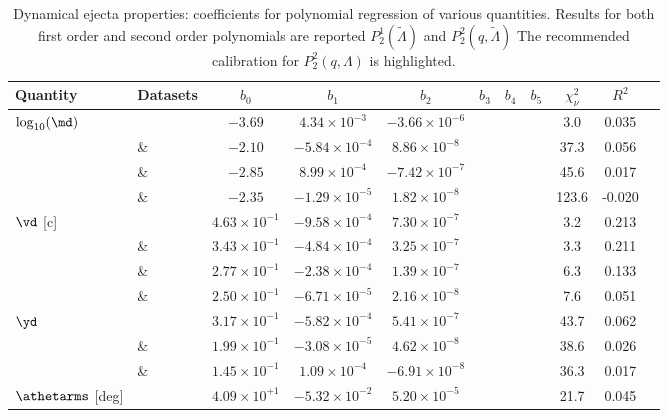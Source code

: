 

\begin{table*}
    \caption{
        \label{tab:dynfit:poly}
        Dynamical ejecta properties:
        coefficients for polynomial regression of various
        quantities. Results for both
        first order and second order polynomials are reported $P_2^1(\tilde{\Lambda})$ and $P_2^2(q, \tilde{\Lambda})$
        The recommended calibration for $P_2^2(q,\Lambda)$ is highlighted.
    }
    \begin{tabular}{l|l|ccccccccc}
        \hline\hline
        Quantity &Datasets & $b_0$ & $b_1$ & $b_2$ & $b_3$ & $b_4$ & $b_5$ &  $\chi^2_{\nu}$ & $R^2$  \\ \hline
        $\log_{10}(\md)$ & \DSrefset{} & $-3.69$ & $4.34\times10^{-3}$ & $-3.66\times10^{-6}$ & & & & 3.0 & 0.035 \\ 
        & \& \DSheatcool{} & $-2.10$ & $-5.84\times10^{-4}$ & $8.86\times10^{-8}$ & & & & 37.3 & 0.056 \\ 
        & \& \DScool{} & $-2.85$ & $8.99\times10^{-4}$ & $-7.42\times10^{-7}$ & & & & 45.6 & 0.017 \\ 
        & \& \DSnone{} & $-2.35$ & $-1.29\times10^{-5}$ & $1.82\times10^{-8}$ & & & & 123.6 & -0.020 \\ 
        \hline
        $\vd$ [c] &  \DSrefset{} & $4.63\times10^{-1}$ & $-9.58\times10^{-4}$ & $7.30\times10^{-7}$ & & & & 3.2 & 0.213 \\ 
        & \& \DSheatcool{} & $3.43\times10^{-1}$ & $-4.84\times10^{-4}$ & $3.25\times10^{-7}$ & & & & 3.3 & 0.211 \\ 
        & \& \DScool{} & $2.77\times10^{-1}$ & $-2.38\times10^{-4}$ & $1.39\times10^{-7}$ & & & & 6.3 & 0.133 \\ 
        & \& \DSnone{} & $2.50\times10^{-1}$ & $-6.71\times10^{-5}$ & $2.16\times10^{-8}$ & & & & 7.6 & 0.051 \\ 
        \hline
        $\yd$ & \DSrefset{} & $3.17\times10^{-1}$ & $-5.82\times10^{-4}$ & $5.41\times10^{-7}$ & & & & 43.7 & 0.062 \\ 
        & \& \DSheatcool{} & $1.99\times10^{-1}$ & $-3.08\times10^{-5}$ & $4.62\times10^{-8}$ & & & & 38.6 & 0.026 \\ 
        & \& \DScool{} & $1.45\times10^{-1}$ & $1.09\times10^{-4}$ & $-6.91\times10^{-8}$ & & & & 36.3 & 0.017 \\ 
        \hline
        $\athetarms$ [deg] & \DSrefset{} & $4.09\times10^{+1}$ & $-5.32\times10^{-2}$ & $5.20\times10^{-5}$ & & & & 21.7 & 0.045 \\ 

\end{tabular}
\end{table*}
